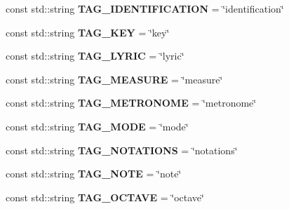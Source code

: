 \begin{DoxyCompactItemize}
\item 
\hypertarget{namespacesinsy_ac872a202bc481d4c11235af30ccbc11e}{const std\-::string {\bfseries \-T\-A\-G\-\_\-\-I\-D\-E\-N\-T\-I\-F\-I\-C\-A\-T\-I\-O\-N} = \char`\"{}identification\char`\"{}}\label{namespacesinsy_ac872a202bc481d4c11235af30ccbc11e}

\item 
\hypertarget{namespacesinsy_a9a26ceefc00ec6ee91371f1cd69c2b7f}{const std\-::string {\bfseries \-T\-A\-G\-\_\-\-K\-E\-Y} = \char`\"{}key\char`\"{}}\label{namespacesinsy_a9a26ceefc00ec6ee91371f1cd69c2b7f}

\item 
\hypertarget{namespacesinsy_a0985e547f0576f958d957314e5d5c204}{const std\-::string {\bfseries \-T\-A\-G\-\_\-\-L\-Y\-R\-I\-C} = \char`\"{}lyric\char`\"{}}\label{namespacesinsy_a0985e547f0576f958d957314e5d5c204}

\item 
\hypertarget{namespacesinsy_a114d24a41caaf36e4e6f2ad2f12c5266}{const std\-::string {\bfseries \-T\-A\-G\-\_\-\-M\-E\-A\-S\-U\-R\-E} = \char`\"{}measure\char`\"{}}\label{namespacesinsy_a114d24a41caaf36e4e6f2ad2f12c5266}

\item 
\hypertarget{namespacesinsy_a8e67f1c1ac9aa51098f298d54edf39ca}{const std\-::string {\bfseries \-T\-A\-G\-\_\-\-M\-E\-T\-R\-O\-N\-O\-M\-E} = \char`\"{}metronome\char`\"{}}\label{namespacesinsy_a8e67f1c1ac9aa51098f298d54edf39ca}

\item 
\hypertarget{namespacesinsy_a068cb070c5e06b1a368e51b6bf1a7833}{const std\-::string {\bfseries \-T\-A\-G\-\_\-\-M\-O\-D\-E} = \char`\"{}mode\char`\"{}}\label{namespacesinsy_a068cb070c5e06b1a368e51b6bf1a7833}

\item 
\hypertarget{namespacesinsy_aa0154f03332eda01cb8f2c8501ff2bb4}{const std\-::string {\bfseries \-T\-A\-G\-\_\-\-N\-O\-T\-A\-T\-I\-O\-N\-S} = \char`\"{}notations\char`\"{}}\label{namespacesinsy_aa0154f03332eda01cb8f2c8501ff2bb4}

\item 
\hypertarget{namespacesinsy_a7c178141eaa5e48e8b60ab4d0fdeae5d}{const std\-::string {\bfseries \-T\-A\-G\-\_\-\-N\-O\-T\-E} = \char`\"{}note\char`\"{}}\label{namespacesinsy_a7c178141eaa5e48e8b60ab4d0fdeae5d}

\item 
\hypertarget{namespacesinsy_a110ea96d7c03a65205c5882efbd97816}{const std\-::string {\bfseries \-T\-A\-G\-\_\-\-O\-C\-T\-A\-V\-E} = \char`\"{}octave\char`\"{}}\label{namespacesinsy_a110ea96d7c03a65205c5882efbd97816}


\end{DoxyCompactItemize}
